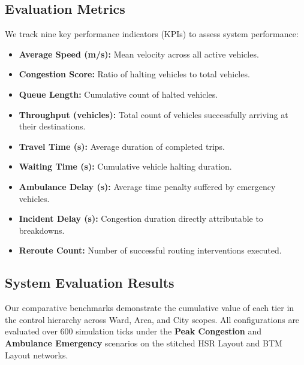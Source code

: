 \documentclass[conference]{IEEEtran}
\begin{document}
\subsection{Evaluation Metrics}
We track nine key performance indicators (KPIs) to assess system performance:
\begin{itemize}
    \item \textbf{Average Speed (m/s):} Mean velocity across all active vehicles.
    \item \textbf{Congestion Score:} Ratio of halting vehicles to total vehicles.
    \item \textbf{Queue Length:} Cumulative count of halted vehicles.
    \item \textbf{Throughput (vehicles):} Total count of vehicles successfully arriving at their destinations.
    \item \textbf{Travel Time (s):} Average duration of completed trips.
    \item \textbf{Waiting Time (s):} Cumulative vehicle halting duration.
    \item \textbf{Ambulance Delay (s):} Average time penalty suffered by emergency vehicles.
    \item \textbf{Incident Delay (s):} Congestion duration directly attributable to breakdowns.
    \item \textbf{Reroute Count:} Number of successful routing interventions executed.
\end{itemize}

\subsection{System Evaluation Results}

Our comparative benchmarks demonstrate the cumulative value of each tier in the control hierarchy across Ward, Area, and City scopes. All configurations are evaluated over 600 simulation ticks under the \textbf{Peak Congestion} and \textbf{Ambulance Emergency} scenarios on the stitched HSR Layout and BTM Layout networks.
\end{document}
